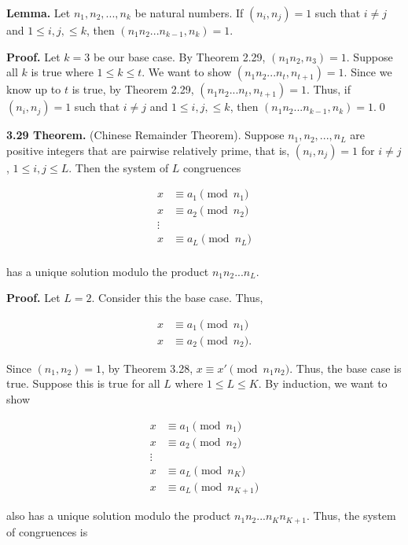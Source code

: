 \documentclass[12pt]{article}
\begin{document}
\noindent\textbf{Lemma.} Let $n_1,n_2,...,n_k$ be natural numbers. If $(n_i,n_j)=1$ such that $i\not= j$ and $1 \leq i,j, \leq k$, then $(n_1n_2...n_{k-1},n_k)=1$.

\bigskip

\noindent\textbf{Proof.} Let $k=3$ be our base case. By Theorem 2.29, $(n_1n_2,n_3)=1$. Suppose all $k$ is true where $1 \leq k \leq t$. We want to show $(n_1n_2...n_{t},n_{t+1})=1$. Since we know up to $t$ is true, by Theorem 2.29, $(n_1n_2...n_{t},n_{t+1})=1$. Thus, if $(n_i,n_j)=1$ such that $i\not= j$ and $1 \leq i,j, \leq k$, then $(n_1n_2...n_{k-1},n_k)=1$.\qed

\bigskip

\noindent\textbf{3.29 Theorem.} (Chinese Remainder Theorem). Suppose $n_1,n_2,...,n_L$ are positive integers that are pairwise relatively prime, that is, $(n_i,n_j)=1$ for $i\not= j$, $1\leq i,j \leq L$. Then the system of $L$ congruences

\begin{align*}
x &\equiv a_1\pmod {n_1} \\
x &\equiv a_2\pmod {n_2} \\
\vdots \\
x &\equiv a_L\pmod {n_L} \\
\end{align*}

\noindent has a unique solution modulo the product $n_1n_2...n_L$.

\bigskip

\noindent\textbf{Proof.} Let $L=2$. Consider this the base case. Thus,

\begin{align*}
x &\equiv a_1 \pmod{n_1}\\
x &\equiv a_2 \pmod{n_2}.
\end{align*}

\noindent Since $(n_1,n_2)=1$, by Theorem 3.28, $x\equiv x' \pmod{n_1n_2}$. Thus, the base case is true. Suppose this is true for all $L$ where $1\leq L \leq K$. By induction, we want to show 

\begin{align*}
x &\equiv a_1\pmod {n_1} \\
x &\equiv a_2\pmod {n_2} \\
\vdots \\
x &\equiv a_L\pmod {n_K} \\
x &\equiv a_L\pmod {n_{K+1}}
\end{align*}

\noindent also has a unique solution modulo the product $n_1n_2...n_Kn_{K+1}$. Thus, the system of congruences is
\end{document}
